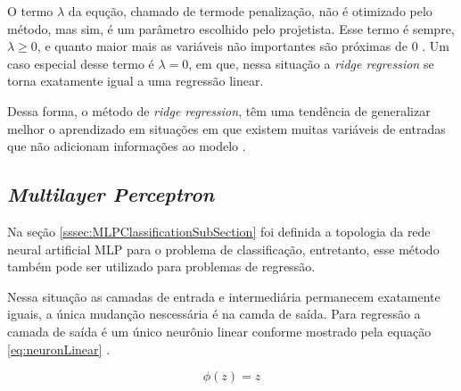 O termo $\lambda$ da equção, chamado de termode penalização, não é otimizado pelo método, mas sim, é um parâmetro escolhido pelo projetista. Esse termo é sempre, $\lambda \geq 0$, e quanto maior mais as variáveis não importantes são próximas de $0$ \cite{Wieringen2015}. Um caso especial desse termo é $\lambda = 0$, em que, nessa situação a \textit{ridge regression} se torna exatamente igual a uma regressão linear.

Dessa forma, o método de \textit{ridge regression}, têm uma tendência de generalizar melhor o aprendizado em situações em que existem muitas variáveis de entradas que não adicionam informações ao modelo \cite{Wieringen2015}.

\subsection{\textit{Multilayer Perceptron}}
Na seção \ref{sssec:MLPClassificationSubSection} foi definida a topologia da rede neural artificial MLP para o problema de classificação, entretanto, esse método também pode ser utilizado para problemas de regressão.

Nessa situação as camadas de entrada e intermediária permanecem exatamente iguais, a única mudanção nescessária é na camda de saída. Para regressão a camada de saída é um único neurônio linear conforme mostrado pela equação \ref{eq:neuronLinear} \cite{Goodfellow-et-al-2016}.  

\begin{equation}
\phi(z) = z
\label{eq:neuronLinear}
\end{equation}

